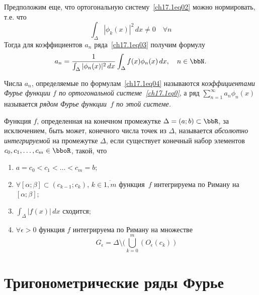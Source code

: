 Предположим еще, что ортогональную систему~\eqref{ch17.1eq02} можно нормировать, т.е. что
$$
\int_\Delta|\phi_k(x)|^2\,dx\ne 0 \quad \forall n
$$
Тогда для коэффициентов $a_n$ ряда~\eqref{ch17.1eq03} получим формулу
\begin{equation} \label{ch17.1eq04}
a_n= \frac{1}{\int_\Delta|\phi_n(x)|^2\,dx} \int_\Delta f(x)\phi_n(x)\,dx, \quad n\in \bbN.
\end{equation}

\begin{defn}
Числа $a_n$, определяемые по формулам~\eqref{ch17.1eq04} называются \textit{коэффициентами Фурье функции $f$ по ортогональной системе~\eqref{ch17.1eq0}}, а ряд $\sum_{n = 1}^{\infty} a_n \phi_n(x)$ называется \textit{рядом Фурье функции~$f$ по этой системе.} 	
\end{defn}

\begin{defn} 
Функция $f$, определенная на конечном промежутке $\Delta=(a;b)\subset \bbR$, за исключением, быть может, конечного числа точек из $\Delta$, называется \textit{абсолютно интегрируемой} на промежутке $\Delta$, если существует конечный набор элементов $c_0,c_1,\ldots,c_m \in \bboR$, такой, что
\begin{enumerate}
\item
$a=c_0<c_1<\ldots<c_m=b$;
\item
$\forall [\alpha;\beta]\subset(c_{k-1};c_k)$, $k\in \overline{1,m}$ функция~$f$ интегрируема по Риману на $[\alpha;\beta]$;	
\item
$\int_\Delta |f(x)|\,dx$ сходится;
\item
$ \forall\epsilon>0$ функция $f$ интегрируема по Риману на множестве 
$$G_{\epsilon}=\Delta \setminus (\bigcup_{k=0}^{m}(O_{\epsilon}(c_k))$$
\end{enumerate}	
\end{defn}
\section{Тригонометрические ряды Фурье}	
	
